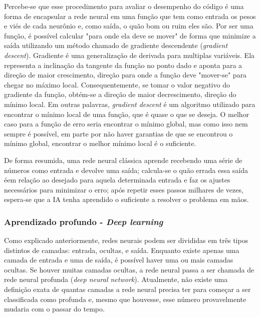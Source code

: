 Percebe-se que esse procedimento para avaliar o desempenho do código é uma forma de encapsular a rede neural em uma função que tem como entrada os pesos e viés de cada neurônio e, como saída, o quão bom ou ruim eles são. Por ser uma função, é possível calcular "para onde ela deve se mover" de forma que minimize a saída utilizando um método chamado de gradiente descendente (\textit{gradient descent}).
Gradiente é uma generalização de derivada para multiplas variáveis. Ela representa a inclinação da tangente da função no ponto dado e aponta para a direção de maior crescimento, direção para onde a função deve "mover-se" para chegar no máximo local. Consequentemente, se tomar o valor negativo do gradiente da função, obtém-se a direção de maior decrescimento, direção do mínimo local.
Em outras palavras, \textit{gradient descent} é um algoritmo utilizado para encontrar o mínimo local de uma função, que é quase o que se deseja. O melhor caso para a função de erro seria encontrar o mínimo global, mas como isso nem sempre é possível, em parte por não haver garantias de que se encontrou o mínimo global, encontrar o melhor mínimo local é o suficiente.

De forma resumida, uma rede neural clássica aprende recebendo uma série de números como entrada e devolve uma saída; calcula-se o quão errada essa saída éem relação ao desejado para aquela determinada entrada e faz os ajustes necessários para minimizar o erro; após repetir esses passos milhares de vezes, espera-se que a IA tenha aprendido o suficiente a resolver o problema em mãos.

\subsubsection{Aprendizado profundo - \textit{Deep learning}}
\label{sec:dl}

Como explicado anteriormente, redes neurais podem ser divididas em três tipos distintos de camadas: entrada, ocultas, e saída. Enquanto existe apenas uma camada de entrada e uma de saída, é possível haver uma ou mais camadas ocultas. Se houver muitas camadas ocultas, a rede neural passa a ser chamada de rede neural profunda (\textit{deep neural network}). Atualmente, não existe uma definição exata de quantas camadas a rede neural precisa ter para começar a ser classificada como profunda e, mesmo que houvesse, esse número provavelmente mudaria com o passar do tempo.

